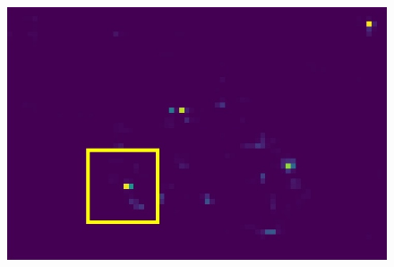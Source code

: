 \begin{figure}[h!]
{\begin{minipage}[t]{3.5cm}
		\end{minipage}
		\begin{minipage}[t]{3.5cm}
			\centering
			\includegraphics[width=0.9\linewidth]{figures/pixel/map3_3}
		\end{minipage}
		\label{fig:singlepixelmap_b}}
	

\end{figure}
